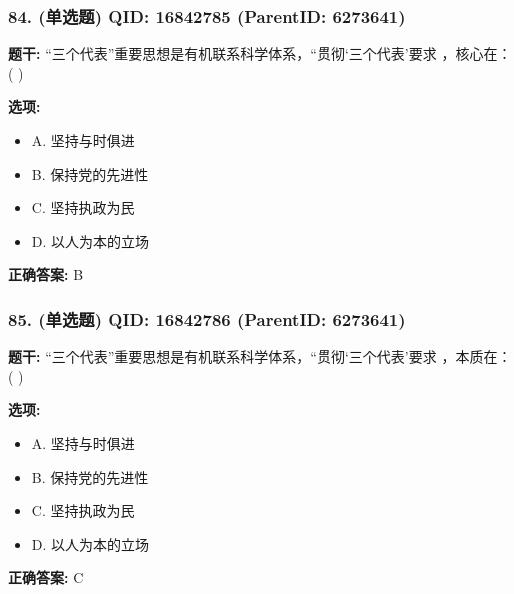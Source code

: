 \documentclass[12pt,UTF8]{ctexart}
\begin{document}
\vspace{0.3em}\hrulefill\vspace{0.7em}

\subsubsection*{84. (单选题) \small QID: 16842785 (ParentID: 6273641)}

\textbf{题干:}
“三个代表”重要思想是有机联系科学体系，“贯彻‘三个代表’要求 ，核心在： ( )



\textbf{选项:}
\begin{itemize}[leftmargin=*]

  \item A. 坚持与时俱进

  \item B. 保持党的先进性

  \item C. 坚持执政为民

  \item D. 以人为本的立场

\end{itemize}

\textbf{正确答案:}
B

\vspace{0.3em}\hrulefill\vspace{0.7em}

\subsubsection*{85. (单选题) \small QID: 16842786 (ParentID: 6273641)}

\textbf{题干:}
“三个代表”重要思想是有机联系科学体系，“贯彻‘三个代表’要求 ，本质在： ( )



\textbf{选项:}
\begin{itemize}[leftmargin=*]

  \item A. 坚持与时俱进

  \item B. 保持党的先进性

  \item C. 坚持执政为民

  \item D. 以人为本的立场

\end{itemize}

\textbf{正确答案:}
C
\end{document}
